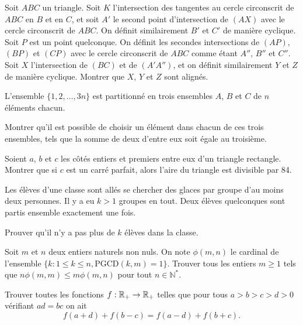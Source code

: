 \begin{exo}{}Soit $ABC$ un triangle. Soit $K$ l'intersection des tangentes au cercle circonscrit de $ABC$ en $B$ et en $C$, et soit $A'$ le second point d'intersection de $(AX)$ avec le cercle circonscrit de $ABC$. On définit similairement  $B'$ et $C'$ de manière cyclique. Soit $P$ est un point quelconque. On définit les secondes intersections de $(AP)$, $(BP)$ et $(CP)$ avec le cercle circonscrit de $ABC$ comme étant $A''$, $B''$ et $C''$. Soit $X$ l'intersection de $(BC)$ et de $(A'A'')$, et on définit similairement $Y$ et $Z$ de manière cyclique. Montrer que $X$, $Y$ et $Z$ sont alignés.
\end{exo}

\begin{exo}{}
L'ensemble $\lbrace 1, 2, \ldots ,3n\rbrace$ est partitionné en trois ensembles $A$, $B$ et $C$ de $n$ éléments chacun.

 Montrer qu'il est possible de choisir un élément dans chacun de ces trois ensembles, tels que la somme de deux d'entre eux soit égale au troisième.
\end{exo}

\begin{exo}{}Soient $a$, $b$ et $c$ les côtés entiers et premiers entre eux d'un triangle rectangle. Montrer que si $c$ est un carré parfait, alors l'aire du triangle est divisible par 84.
\end{exo}

\begin{exo}{}
Les \'el\`eves d'une classe sont all\'es se chercher des glaces par groupe d'au moins deux personnes. Il y a eu $k>1$ groupes en tout. Deux élèves quelconques sont partis ensemble exactement une fois.

 Prouver qu'il n'y a pas plus de $k$ \'el\`eves dans la classe.
\end{exo}

\begin{exo}{}Soit $m$ et $n$ deux entiers naturels non nuls. On note $\phi(m,n)$ le
cardinal de l'ensemble $\{k : 1 \leq k \leq n, \mathrm{PGCD}(k,m) =
1\}$. Trouver tous les entiers $m \geq 1$ tels que $n \phi(m,m) \leq m
\phi(m,n)$ pour tout $n \in \mathbb{N}^\ast$.
\end{exo}


\begin{exo}{}
Trouver toutes les fonctions $f : \mathbb R_{+} \rightarrow \mathbb R_{+}$ telles que pour tous $a>b>c>d>0$ vérifiant $ad=bc$ on ait
$$f(a+d)+f(b-c)=f(a-d)+f(b+c).$$

\end{exo}

